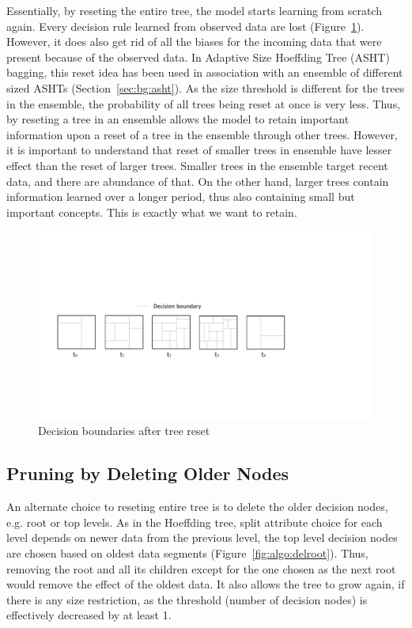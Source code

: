 Essentially, by reseting the entire tree, the model starts learning from scratch again. Every decision rule learned from observed data are lost (Figure~\ref{fig:algo:resetdb}). However, it does also get rid of all the biases for the incoming data that were present because of the observed data. In Adaptive Size Hoeffding Tree (ASHT) bagging, this reset idea has been used in association with an ensemble of different sized ASHTs (Section~\ref{sec:bg:asht}). As the size threshold is different for the trees in the ensemble, the probability of all trees being reset at once is very less. Thus, by  reseting a tree  in an ensemble allows the model to retain important information upon a reset of a tree in the ensemble through other trees. However, it is important to understand that reset of smaller trees in ensemble have lesser effect than the reset of larger trees. Smaller trees in the ensemble target recent data, and there are abundance of that. On the other hand, larger trees contain information learned over a longer period, thus also containing small but important concepts. This is exactly what we want to retain.

\begin{figure}[htbp]
    \begin{center}
        \includegraphics[width=14.0cm]{figs/resetdb.pdf}
        \caption{Decision boundaries after tree reset}
        \label{fig:algo:resetdb}
    \end{center}
\end{figure}

\subsection{Pruning by Deleting Older Nodes}
An alternate choice to reseting entire tree is to delete the older decision nodes, e.g. root or top levels. As in the Hoeffding tree, split attribute choice for each level depends on newer data from the previous level, the top level decision nodes are chosen based on oldest data segments (Figure~\ref{fig:algo:delroot}). Thus, removing the root and all its children except for the one chosen as the next root would remove the effect of the oldest data. It also allows the tree to grow again, if there is any size restriction, as the threshold (number of decision nodes) is effectively decreased by at least 1.

